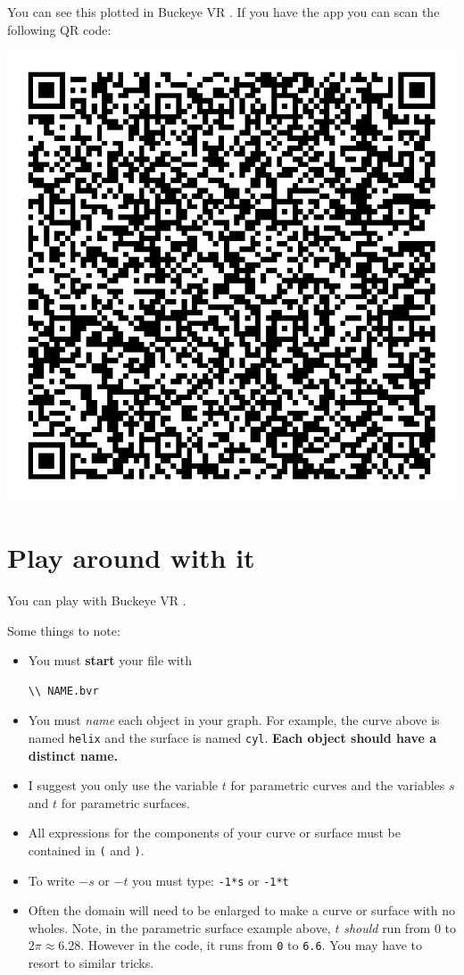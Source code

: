 \documentclass{ximera}
\begin{document}
You can see this plotted in Buckeye VR
.
If you have the app you can scan the following QR code:
\begin{image}
\includegraphics{bvrQR3.png}  
\end{image}

\section{Play around with it}
You can play with Buckeye VR 
.

Some things to note: 
\begin{itemize}
\item You must \textbf{start} your file with
\begin{verbatim}
\\ NAME.bvr
\end{verbatim}
  \item You must \textit{name} each object in your graph. For example,
    the curve above is named \verb|helix| and the surface is named
    \verb|cyl|. \textbf{Each object should have a distinct name.}
  \item I suggest you only use the variable $t$ for parametric curves
    and the variables $s$ and $t$ for parametric surfaces.
  \item All expressions for the components of your curve or surface
    must be contained in \verb|(| and \verb|)|.
  \item To write $-s$ or $-t$ you must type: \verb|-1*s| or \verb|-1*t|
  \item Often the domain will need to be enlarged to make a curve or
    surface with no wholes. Note, in the parametric surface example
    above, $t$ \textit{should} run from $0$ to $2\pi\approx
    6.28$. However in the code, it runs from \verb|0| to
    \verb|6.6|. You may have to resort to similar tricks.
\end{itemize}
\end{document}
